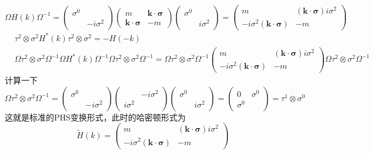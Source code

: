 \documentclass[a4paper]{article}
\numberwithin{equation}{subsection}
\begin{document}
\begin{equation*}
    \Omega H(k)\Omega^{-1}=\begin{pmatrix}
        \sigma^0&\\
        &-i\sigma^2
    \end{pmatrix}\begin{pmatrix}
        m&\bm{k}\cdot\bm{\sigma}\\
        \bm{k}\cdot\bm{\sigma}&-m
    \end{pmatrix}\begin{pmatrix}
        \sigma^0&\\
        &i\sigma^2
    \end{pmatrix}=\begin{pmatrix}
        m&(\bm{k}\cdot\bm{\sigma})i\sigma^2\\
        -i\sigma^2(\bm{k}\cdot\bm{\sigma})&-m
    \end{pmatrix}
\end{equation*}
\begin{equation*}
    \begin{split}
        &\tau^2\otimes\sigma^2H^*(k)\tau^2\otimes\sigma^2=-H(-k)\\
        &\Omega\tau^2\otimes\sigma^2\Omega^{-1}\Omega H^*(k)\Omega^{-1}\Omega\tau^2\otimes\sigma^2\Omega^{-1}=\Omega\tau^2\otimes\sigma^2\Omega^{-1}\begin{pmatrix}
            m&(\bm{k}\cdot\bm{\sigma})i\sigma^2\\
            -i\sigma^2(\bm{k}\cdot\bm{\sigma})&-m
        \end{pmatrix}\Omega\tau^2\otimes\sigma^2\Omega^{-1}
    \end{split}
\end{equation*}
计算一下
\begin{equation*}
    \Omega\tau^2\otimes\sigma^2\Omega^{-1}=\begin{pmatrix}
        \sigma^0&\\
        &-i\sigma^2
    \end{pmatrix}\begin{pmatrix}
        &-i\sigma^2\\
        i\sigma^2&
    \end{pmatrix}\begin{pmatrix}
        \sigma^0&\\
        &i\sigma^2
    \end{pmatrix}=\begin{pmatrix}
        0&\sigma^0\\
        \sigma^0&
    \end{pmatrix}=\tau^1\otimes\sigma^0
\end{equation*}
这就是标准的PHS变换形式，此时的哈密顿形式为
\begin{equation}
    \tilde{H}(k)=\begin{pmatrix}
        m&(\bm{k}\cdot\bm{\sigma})i\sigma^2\\
        -i\sigma^2(\bm{k}\cdot\bm{\sigma})&-m
    \end{pmatrix}
\end{equation}
\end{document}
